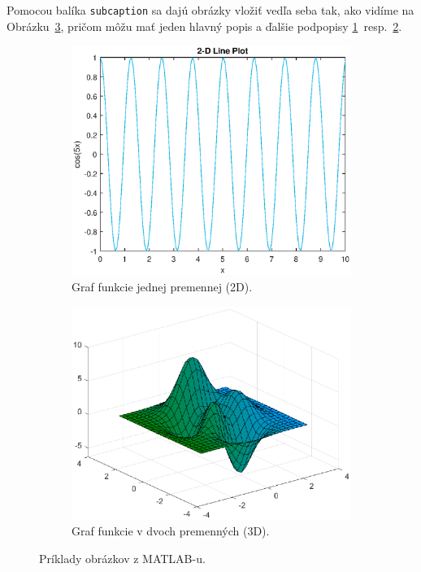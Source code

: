 Pomocou balíka \verb|subcaption| sa dajú obrázky vložiť vedľa seba tak, ako vidíme na Obrázku~\ref{fig:matlab}, pričom môžu mať jeden hlavný popis a ďalšie podpopisy \ref{fig:matlab_2D}~resp.~\ref{fig:matlab_3D}.
\begin{figure}[!h]
	\centering
	\begin{subfigure}[b]{0.45\textwidth}
		\includegraphics[width=\textwidth]{matlab_2D}
		\caption{Graf funkcie jednej premennej (2D).}
		\label{fig:matlab_2D}
	\end{subfigure}
	\qquad
	\begin{subfigure}[b]{0.45\textwidth}
		\includegraphics[width=\textwidth]{matlab_3D}
		\caption{Graf funkcie v dvoch premenných (3D).}
		\label{fig:matlab_3D}
	\end{subfigure}
	\caption{Príklady obrázkov z MATLAB-u.}\label{fig:matlab}
\end{figure}


